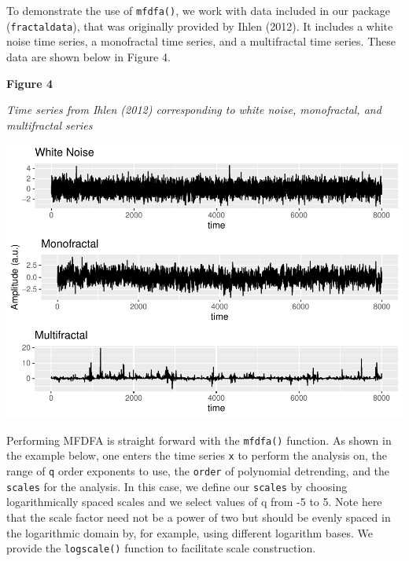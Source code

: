 \documentclass[
  man]{apa6}
\begin{document}
To demonstrate the use of \texttt{mfdfa()}, we work with data included in our
package (\texttt{fractaldata}), that was originally provided by
Ihlen (2012). It includes a white noise
time series, a monofractal time series, and a multifractal time series.
These data are shown below in Figure 4.

\textbf{Figure 4}

\emph{Time series from Ihlen (2012) corresponding to white noise,
monofractal, and multifractal series}

\includegraphics{fractal_regression_paper_brm_files/figure-latex/unnamed-chunk-9-1.pdf}

Performing MFDFA is straight forward with the \texttt{mfdfa()} function. As
shown in the example below, one enters the time series \texttt{x} to perform
the analysis on, the range of \texttt{q} order exponents to use, the \texttt{order} of
polynomial detrending, and the \texttt{scales} for the analysis. In this case,
we define our \texttt{scales} by choosing logarithmically spaced scales and we
select values of q from -5 to 5. Note here that the scale factor need
not be a power of two but should be evenly spaced in the logarithmic
domain by, for example, using different logarithm bases. We provide the
\texttt{logscale()} function to facilitate scale construction.
\end{document}
